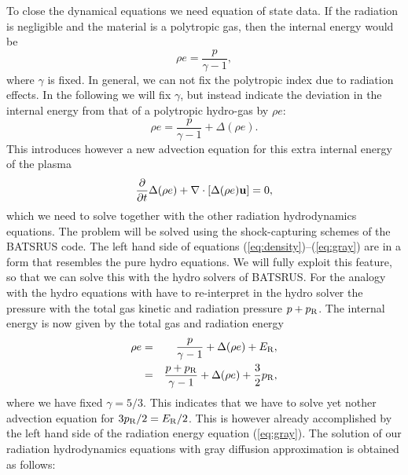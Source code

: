 \documentclass[12pt]{article}
\newcommand{\Erad}{E_{\rm R}}
\newcommand{\prad}{p_{\rm R}}
\begin{document}
To close the dynamical equations we need equation of state data. 
If the radiation is negligible and the material is a polytropic gas, 
then the internal energy would be 
\begin{equation} 
\rho e = \frac{p}{\gamma - 1}, 
\end{equation} 
where $\gamma$ is fixed. In general, we can not fix the polytropic index due 
to radiation effects. In the following we will fix $\gamma$, but instead  
indicate the deviation in the internal energy from that of a polytropic 
hydro-gas by $\rho e$: 
\begin{equation} 
\rho e = \frac{p}{\gamma - 1} + \Delta (\rho e). 
\end{equation} 
This introduces however a new advection equation for this extra internal 
energy of the plasma 
\begin{equation} 
\frac{\partial}{\partial t} \Delta(\rho e) + \nabla\cdot\left[  
\Delta(\rho e) {\bf u} \right] = 0, 
\end{equation} 
which we need to solve together with the other radiation hydrodynamics 
equations.  The problem will be solved using the shock-capturing schemes of 
the BATSRUS code. The left hand side of equations 
(\ref{eq:density})--(\ref{eq:gray}) are in a form that resembles the pure 
hydro equations. We will fully exploit this feature, so that we can solve 
this with the hydro solvers of BATSRUS. For the analogy with the hydro 
equations with have to re-interpret in the hydro solver the pressure with 
the total gas kinetic and radiation pressure $p+\prad$. The internal 
energy is now given by the total gas and radiation energy 
\begin{eqnarray} \rho e &=& \frac{p}{\gamma - 1} + \Delta (\rho e) + 
\Erad, \nonumber \\        
&=& \frac{p+\prad}{\gamma - 1} + \Delta (\rho e) + \frac{3}{2}\prad, 
\end{eqnarray} 
where we have fixed $\gamma=5/3$. This indicates that we have to solve yet 
nother advection equation for $3\prad/2=\Erad/2$. This is however 
already accomplished by the left hand side of the radiation energy equation 
(\ref{eq:gray}).  The solution of our radiation hydrodynamics equations with 
gray diffusion approximation is obtained as follows: 
\end{document}
